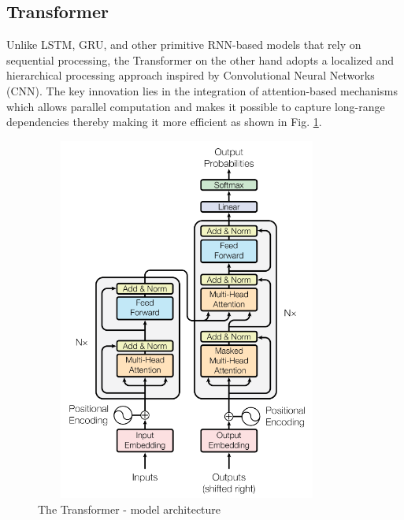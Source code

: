 \documentclass[preprint,12pt]{elsarticle}
\begin{document}
\subsection{Transformer}
Unlike LSTM, GRU, and other primitive RNN-based models that rely on sequential processing, the Transformer on the other hand adopts a localized and hierarchical processing approach inspired by Convolutional Neural Networks (CNN). The key innovation lies in the integration of attention-based mechanisms which allows parallel computation and makes it possible to capture long-range dependencies thereby making it more efficient as shown in Fig. \ref{transformer}.
\begin{center}
	\begin{figure}[!htbp]
		\centering
		\includegraphics[width=10cm, height=12cm]{transformer.png}
		\caption{The Transformer - model architecture\cite{vaswani2017attention}}
		\label{transformer}
	\end{figure}
\end{center}
\end{document}
